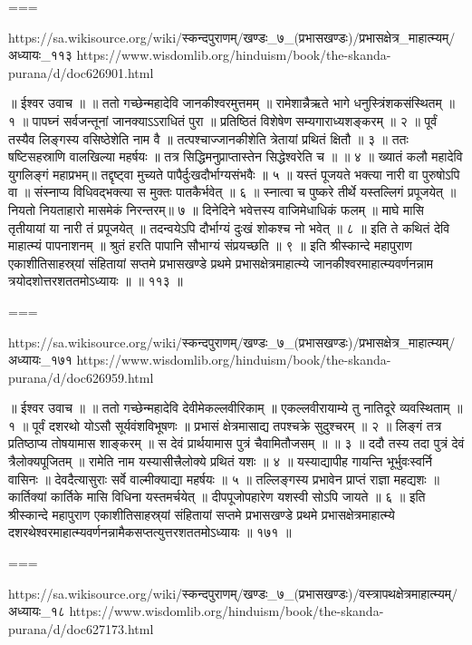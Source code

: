 ===

https://sa.wikisource.org/wiki/स्कन्दपुराणम्/खण्डः_७_(प्रभासखण्डः)/प्रभासक्षेत्र_माहात्म्यम्/अध्यायः_११३
https://www.wisdomlib.org/hinduism/book/the-skanda-purana/d/doc626901.html

॥ ईश्वर उवाच ॥ ॥
ततो गच्छेन्महादेवि जानकीश्वरमुत्तमम् ॥
रामेशान्नैऋते भागे धनुस्त्रिंशकसंस्थितम् ॥ १ ॥
पापघ्नं सर्वजन्तूनां जानक्याऽऽराधितं पुरा ॥
प्रतिष्ठितं विशेषेण सम्यगाराध्यशङ्करम् ॥ २ ॥
पूर्वं तस्यैव लिङ्गस्य वसिष्ठेशेति नाम वै ॥
तत्पश्चाज्जानकीशेति त्रेतायां प्रथितं क्षितौ ॥ ३ ॥
ततः षष्टिसहस्राणि वालखिल्या महर्षयः ॥
तत्र सिद्धिमनुप्राप्तास्तेन सिद्धेश्वरेति च ॥ ॥ ४ ॥
ख्यातं कलौ महादेवि युगलिङ्गं महाप्रभम्॥
तद्दृष्ट्वा मुच्यते पापैर्दुःखदौर्भाग्यसंभवैः ॥ ५ ॥
यस्तं पूजयते भक्त्या नारी वा पुरुषोऽपि वा ॥
संस्नाप्य विधिवद्भक्त्या स मुक्तः पातकैर्भवेत् ॥ ६ ॥
स्नात्वा च पुष्करे तीर्थे यस्तल्लिगं प्रपूजयेत् ॥
नियतो नियताहारो मासमेकं निरन्तरम्॥ ७ ॥
दिनेदिने भवेत्तस्य वाजिमेधाधिकं फलम् ॥
माघे मासि तृतीयायां या नारी तं प्रपूजयेत् ॥
तदन्वयेऽपि दौर्भाग्यं दुःखं शोकश्च नो भवेत् ॥ ८ ॥
इति ते कथितं देवि माहात्म्यं पापनाशनम् ॥
श्रुतं हरति पापानि सौभाग्यं संप्रयच्छति ॥ ९ ॥
इति श्रीस्कान्दे महापुराण एकाशीतिसाहस्र्यां संहितायां सप्तमे प्रभासखण्डे प्रथमे प्रभासक्षेत्रमाहात्म्ये जानकीश्वरमाहात्म्यवर्णनन्नाम त्रयोदशोत्तरशततमोऽध्यायः ॥ ॥ ११३ ॥

===

https://sa.wikisource.org/wiki/स्कन्दपुराणम्/खण्डः_७_(प्रभासखण्डः)/प्रभासक्षेत्र_माहात्म्यम्/अध्यायः_१७१
https://www.wisdomlib.org/hinduism/book/the-skanda-purana/d/doc626959.html

॥ ईश्वर उवाच ॥ ॥
ततो गच्छेन्महादेवि देवीमेकल्लवीरिकाम् ॥
एकल्लवीरायाम्ये तु नातिदूरे व्यवस्थिताम् ॥ १ ॥
पूर्वं दशरथो योऽसौ सूर्यवंशविभूषणः ॥
प्रभासं क्षेत्रमासाद्य तपश्चक्रे सुदुश्चरम् ॥ २ ॥
लिङ्गं तत्र प्रतिष्ठाप्य तोषयामास शाङ्करम् ॥
स देवं प्रार्थयामास पुत्रं चैवामितौजसम् ॥ ॥ ३ ॥
ददौ तस्य तदा पुत्रं देवं त्रैलोक्यपूजितम् ॥
रामेति नाम यस्यासीत्त्रैलोक्ये प्रथितं यशः ॥ ४ ॥
यस्याद्यापीह गायन्ति भूर्भुवःस्वर्नि वासिनः ॥
देवदैत्यासुराः सर्वे वाल्मीक्याद्या महर्षयः ॥ ५ ॥
तल्लिङ्गस्य प्रभावेन प्राप्तं राज्ञा महद्यशः ॥
कार्तिक्यां कार्तिके मासि विधिना यस्तमर्चयेत् ॥
दीपपूजोपहारेण यशस्वी सोऽपि जायते ॥ ६ ॥
इति श्रीस्कान्दे महापुराण एकाशीतिसाहस्र्यां संहितायां सप्तमे प्रभासखण्डे प्रथमे प्रभासक्षेत्रमाहात्म्ये दशरथेश्वरमाहात्म्यवर्णनन्नामैकसप्तत्युत्तरशततमोऽध्यायः ॥ १७१ ॥

===

https://sa.wikisource.org/wiki/स्कन्दपुराणम्/खण्डः_७_(प्रभासखण्डः)/वस्त्रापथक्षेत्रमाहात्म्यम्/अध्यायः_१८
https://www.wisdomlib.org/hinduism/book/the-skanda-purana/d/doc627173.html

